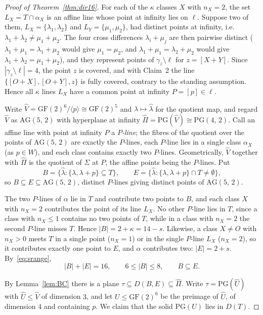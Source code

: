 \documentclass[10pt,a4paper]{amsart}
\newcommand{\AG}[2]{\mathrm{AG}(#1,\,#2)}
\newcommand{\GF}[1]{\mathrm{GF}(#1)}
\newcommand{\PGv}[1]{\mathrm{PG}(#1)}
\newcommand{\PG}[2]{\mathrm{PG}(#1,\,#2)}
\newcommand{\la}{\lambda}
\begin{document}
\begin{proof}[Proof of Theorem~\ref{thm:dir16}]
\smallskip
For each of the $\kappa$ classes $X$ with $n_X=2$, the set $L_X=T\cap\alpha_X$ is an affine line whose point at infinity lies on $\ell$.  Suppose two of them, $L_X=\{\la_1,\la_2\}$ and $L_Y=\{\mu_1,\mu_2\}$, had distinct points at infinity, i.e.\ $\la_1+\la_2\neq\mu_1+\mu_2$.  The four cross differences $\la_i+\mu_j$ are then pairwise distinct ($\la_1+\mu_1=\la_1+\mu_2$ would give $\mu_1=\mu_2$, and $\la_1+\mu_1=\la_2+\mu_2$ would give
$\la_1+\la_2=\mu_1+\mu_2$), and they represent points of $\gamma_z\setminus\ell$ for $z=[X+Y]$. Since $|\gamma_z\setminus\ell|=4$, the point $z$ is covered, and with Claim~2 the line $\{[O+X],[O+Y],z\}$ is fully covered, contrary to the standing assumption.  Hence all $\kappa$ lines $L_X$ have a common point at infinity $P=[p]\in\ell$.

Write $\widehat V=\GF2^6/\langle p\rangle\cong\GF2^5$ and $\la\mapsto\widehat\la$ for the quotient map, and regard $\widehat V$ as $\AG52$ with hyperplane at infinity $\widehat\Pi=\PGv{\widehat V}\cong\PG42$.  Call an affine line with point at infinity $P$ a \textit{$P$-line}; the fibres of the quotient over the points of $\AG52$ are exactly the $P$-lines, each $P$-line lies in a single class $\alpha_X$ (as $p\in W$), and each class
contains exactly two $P$-lines.  Geometrically, $\widehat V$ together with $\widehat\Pi$ is the quotient of $\Sigma$ at $P$, the affine points being the $P$-lines.  Put
\[
B=\{\widehat\la : \{\la,\la+p\}\subseteq T\},\qquad E=\{\widehat\la : \{\la,\la+p\}\cap T\neq\emptyset\},
\]
so $B\subseteq E\subseteq\AG52$, distinct $P$-lines giving distinct points of $\AG52$.

The two $P$-lines of $\alpha$ lie in $T$ and contribute two points to $B$, and each class $X$ with $n_X=2$ contributes the point of its line $L_X$. No other $P$-line lies in $T$, since a class with $n_X\le1$ contains no two points of $T$, while in a class with $n_X=2$ the second $P$-line misses $T$.  Hence $|B|=2+\kappa=14-s$.  Likewise, a class $X\neq O$ with $n_X>0$ meets $T$ in a single point ($n_X=1$) or
in the single $P$-line $L_X$ ($n_X=2$), so it contributes exactly one point to $E$, and $\alpha$ contributes two: $|E|=2+s$.  By~\eqref{eq:srange},
\[
|B|+|E|=16,\qquad 6\le|B|\le8,\qquad B\subseteq E .
\]

\smallskip
By Lemma~\ref{lem:BC} there is a plane $\tau\subseteq D(B,E)\subseteq\widehat\Pi$. Write $\tau=\PGv{\widehat U}$ with $\widehat U\le\widehat V$ of dimension $3$, and let $U\le\GF2^6$ be the preimage of $\widehat U$, of dimension $4$ and containing $p$.  We claim that the solid $\PGv U$ lies in $D(T)$.


\end{proof}
\end{document}
